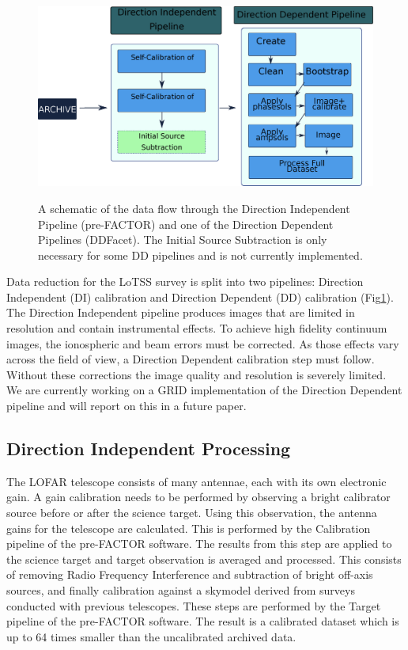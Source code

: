 \begin{figure}
 \includegraphics[width=.79\textwidth]{ch3/figures/DIDDpipe.eps}\\
 \caption[Prefactor and DDFacet Data Flow]{A schematic of the data flow through the Direction Independent Pipeline (pre-FACTOR\cite{prefactor}) and one of the Direction Dependent Pipelines (DDFacet). The Initial Source Subtraction is only necessary for some DD pipelines and is not currently implemented. }
 \label{fig:ch3_both_pipes}
\end{figure}


Data reduction for the LoTSS survey is split into two pipelines: Direction Independent (DI) calibration and Direction Dependent (DD) calibration (Fig\ref{fig:ch3_both_pipes}). The Direction Independent pipeline\cite{prefactor}\cite{van2016lofar} produces images that are limited in resolution and contain instrumental effects\cite{lotss}. To achieve high fidelity continuum images, the ionospheric and beam errors must be corrected\cite{lofar_calib}. As those effects vary across the field of view, a Direction Dependent calibration step must follow. Without these corrections the image quality and resolution is severely limited\cite{van2016lofar}.  We are currently working on a GRID implementation of the Direction Dependent pipeline and will report on this in a future paper.


\subsection{Direction Independent Processing}\label{sec:ch3_dirin_process}

The LOFAR telescope consists of many antennae, each with its own electronic gain. A gain calibration needs to be performed by observing a bright calibrator source before or after the science target\cite{lofar_calib}. Using this observation, the antenna gains for the telescope are calculated. This is performed by the Calibration pipeline of the pre-FACTOR software\cite{prefactor}.  The results from this step are applied to the science target and target observation is averaged  and processed. This consists of removing Radio Frequency Interference and subtraction of bright off-axis sources, and finally calibration against a skymodel derived from surveys conducted with previous telescopes\cite{lofar_calib}\cite{van2016lofar}. These steps are performed by the Target pipeline of the pre-FACTOR software\cite{prefactor}. The result is a calibrated dataset which is up to 64 times smaller than the uncalibrated archived data.

